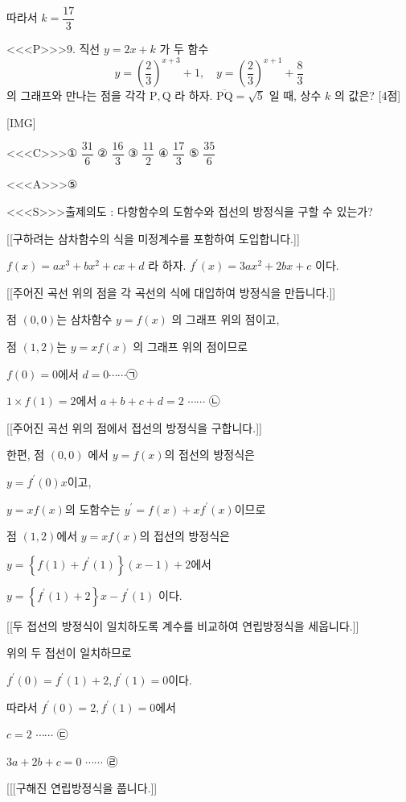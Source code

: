 \documentclass{oblivoir}
\begin{document}
따라서 $k=\dfrac{17}{3}$


<<<P>>>9. 직선 $y=2 x+k$ 가 두 함수
$$
y=\left(\dfrac{2}{3}\right)^{x+3}+1, \quad y=\left(\dfrac{2}{3}\right)^{x+1}+\dfrac{8}{3}
$$
의 그래프와 만나는 점을 각각 $\mathrm{P}, \mathrm{Q}$ 라 하자. $\overline{\mathrm{PQ}}=\sqrt{5}$ 일 때, 상수 $k$ 의 값은? [4점]

[IMG]

<<<C>>>① $\dfrac{31}{6}$
② $\dfrac{16}{3}$
③ $\dfrac{11}{2}$
④ $\dfrac{17}{3}$
⑤ $\dfrac{35}{6}$


<<<A>>>⑤

<<<S>>>출제의도 : 다항함수의 도함수와 접선의 방정식을 구할 수 있는가?

[[구하려는 삼차함수의 식을 미정계수를 포함하여 도입합니다.]]

$f(x)=a x^{3}+b x^{2}+c x+d$ 라 하자. $f^{\prime}(x)=3 a x^{2}+2 b x+c$ 이다.

[[주어진 곡선 위의 점을 각 곡선의 식에 대입하여 방정식을 만듭니다.]]

점 $(0,0)$는 삼차함수 $y=f(x)$ 의 그래프 위의 점이고,

점 $(1,2)$는 $y=x f(x)$ 의 그래프 위의 점이므로 

$f(0)=0$에서  $d=0 \cdots \cdots $㉠

$1 \times f(1)=2$에서  $a+b+c+d=2$ $\cdots \cdots$ ㉡

[[주어진 곡선 위의 점에서 접선의 방정식을 구합니다.]]

한편, 점 $(0,0)$ 에서 $y=f(x)$의 접선의 방정식은

$y=f^{\prime}(0) x$이고,

$y=x f(x)$의 도함수는 $y^{\prime}=f(x)+x f^{\prime}(x)$이므로

점 $(1,2)$에서 $y=x f(x)$의 접선의 방정식은

$y=\left\{f(1)+f^{\prime}(1)\right\}(x-1)+2$에서

$y=\left\{f^{\prime}(1)+2\right\} x-f^{\prime}(1) $ 이다.

[[두 접선의 방정식이 일치하도록 계수를 비교하여 연립방정식을 세웁니다.]]

위의 두 접선이 일치하므로

$f^{\prime}(0)=f^{\prime}(1)+2, f^{\prime}(1)=0$이다.

따라서 $f^{\prime}(0)=2, f^{\prime}(1)=0$에서

$c=2$  $\cdots \cdots$ ㉢

$3 a+2 b+c=0$  $\cdots \cdots$ ㉣

[[[구해진 연립방정식을 풉니다.]]
\end{document}
